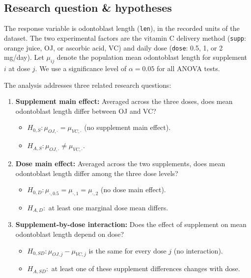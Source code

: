 \documentclass[
  11pt,
]{article}
\providecommand{\tightlist}{%
  \setlength{\itemsep}{0pt}\setlength{\parskip}{0pt}}
\begin{document}
\subsection{Research question \&
hypotheses}\label{research-question-hypotheses}

The response variable is odontoblast length (\texttt{len}), in the
recorded units of the dataset. The two experimental factors are the
vitamin C delivery method (\texttt{supp}: orange juice, OJ, or ascorbic
acid, VC) and daily dose (\texttt{dose}: 0.5, 1, or 2 mg/day). Let
\(\mu_{ij}\) denote the population mean odontoblast length for
supplement \(i\) at dose \(j\). We use a significance level of
\(\alpha=0.05\) for all ANOVA tests.

The analysis addresses three related research questions:

\begin{enumerate}
\def\labelenumi{\arabic{enumi}.}
\item
  \textbf{Supplement main effect:} Averaged across the three doses, does
  mean odontoblast length differ between OJ and VC?

  \begin{itemize}
  \tightlist
  \item
    \(H_{0,S}: \mu_{OJ,\cdot}=\mu_{VC,\cdot}\) (no supplement main
    effect).
  \item
    \(H_{A,S}: \mu_{OJ,\cdot}\ne\mu_{VC,\cdot}\).
  \end{itemize}
\item
  \textbf{Dose main effect:} Averaged across the two supplements, does
  mean odontoblast length differ among the three dose levels?

  \begin{itemize}
  \tightlist
  \item
    \(H_{0,D}: \mu_{\cdot,0.5}=\mu_{\cdot,1}=\mu_{\cdot,2}\) (no dose
    main effect).
  \item
    \(H_{A,D}:\) at least one marginal dose mean differs.
  \end{itemize}
\item
  \textbf{Supplement-by-dose interaction:} Does the effect of supplement
  on mean odontoblast length depend on dose?

  \begin{itemize}
  \tightlist
  \item
    \(H_{0,SD}: \mu_{OJ,j}-\mu_{VC,j}\) is the same for every dose \(j\)
    (no interaction).
  \item
    \(H_{A,SD}:\) at least one of these supplement differences changes
    with dose.
  \end{itemize}
\end{enumerate}
\end{document}
